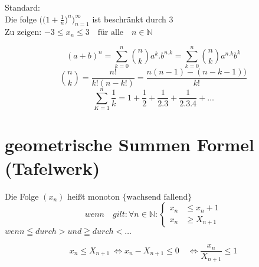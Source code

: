 \begin{example}{Standard:}\\

{Die folge}
$ \bigg(\big(1 + \frac{1}{n} \big)^n \bigg)^\infty_{n=1}$
{ist beschränkt durch 3}\\

Zu zeigen: \quad $ -3 \leq x_n \leq 3 \quad \text{für alle} \quad n \in \mathbb{N} $


\[ { (a+b)^n = \sum_{k=0}^{n} \binom{n}{k} a^k . b^{n .k} = \sum_{k=0}^{n} \binom{n}{k} a^{n.k} b^k }  \]
\[  \binom{n}{k} = \frac{n!}{k!(n-k!)} =  \frac{n(n-1) -(n-k-1))}{k!} \]
\[  \sum_{K=1}^{n} \frac{1}{k} = 1+ \frac{1}{2} + \frac{1}{2.3} + \frac{1}{2.3.4} + \dots \]
\end{example}


\section{geometrische Summen Formel (Tafelwerk)}
\begin{definition}[Monoton]

    Die Folge $(x_n)$ heißt monoton $\Big\{ \text{wachsend fallend} \Big\}$
    \[ wenn \quad gilt: \forall n \in \mathbb{N}:
    \left\{
    \begin{array}{ll}
        x_n  & \leq x_n +1 \\
        x_n  & \geq X_{n+1}
    \end{array}
    \right. \]
    $ wenn \leqq durch > und \geqq durch < \dots  $
\end{definition}
\begin{remark}
    \[ x_n \leq X_{n+1} \ \Leftrightarrow  x_n - X_{n+1} \leq 0 \quad \Leftrightarrow  \frac{x_n}{X_{n+1}} \leq 1 \]
\end{remark}

